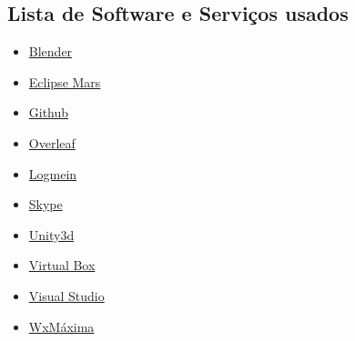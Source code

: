 
\subsection{Lista de Software e Serviços usados}

\begin{itemize}
\item \href{https://www.blender.org/}{Blender}
\item \href{https://eclipse.org/mars/}{Eclipse Mars} 
\item \href{https://github.com/}{Github}
\item \href{https://www.overleaf.com}{Overleaf}
\item \href{https://secure.logmein.com/home/pt}{Logmein}
\item \href{https://www.skype.com/pt/}{Skype}
\item \href{https://unity3d.com/pt}{Unity3d}
\item \href{https://www.virtualbox.org/}{Virtual Box}
\item \href{https://www.visualstudio.com/}{Visual Studio}
\item \href{http://andrejv.github.io/wxmaxima/}{WxMáxima}
\end{itemize}